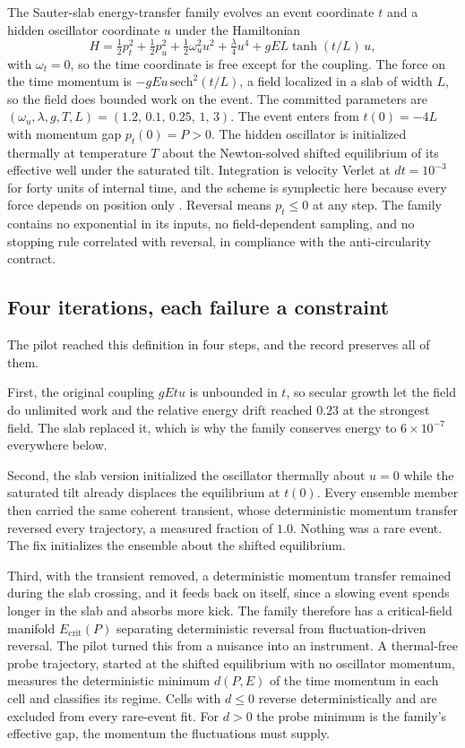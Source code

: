 \documentclass[aps,prd,reprint,nofootinbib,longbibliography]{revtex4-2}
\begin{document}
The Sauter-slab energy-transfer family evolves an event coordinate $t$
and a hidden oscillator coordinate $u$ under the Hamiltonian
\begin{equation}
H = \tfrac{1}{2}p_{t}^{2} + \tfrac{1}{2}p_{u}^{2}
  + \tfrac{1}{2}\omega_{u}^{2}u^{2} + \tfrac{\lambda}{4}u^{4}
  + g E L \tanh(t/L)\, u,
\label{eq:ham}
\end{equation}
with $\omega_{t} = 0$, so the time coordinate is free except for the
coupling.  The force on the time momentum is
$-gEu\,\mathrm{sech}^{2}(t/L)$, a field localized in a slab of width $L$,
so the field does bounded work on the event.  The committed parameters
are $(\omega_{u}, \lambda, g, T, L) = (1.2,\, 0.1,\, 0.25,\, 1,\, 3)$.
The event enters from $t(0) = -4L$ with momentum gap $p_{t}(0) = P > 0$.
The hidden oscillator is initialized thermally at temperature $T$ about
the Newton-solved shifted equilibrium of its effective well under the
saturated tilt.  Integration is velocity Verlet at $dt = 10^{-3}$ for forty units of
internal time, and the scheme is symplectic here because every force
depends on position only \cite{HairerLubichWanner}.  Reversal means
$p_{t} \le 0$ at any step.
The family contains no exponential in its inputs, no field-dependent
sampling, and no stopping rule correlated with reversal, in compliance
with the anti-circularity contract.

\subsection{Four iterations, each failure a constraint}

The pilot reached this definition in four steps, and the record preserves
all of them.

First, the original coupling $gEtu$ is unbounded in $t$, so secular
growth let the field do unlimited work and the relative energy drift
reached $0.23$ at the strongest field.  The slab replaced it, which is
why the family conserves energy to $6\times10^{-7}$ everywhere below.

Second, the slab version initialized the oscillator thermally about
$u = 0$ while the saturated tilt already displaces the equilibrium at
$t(0)$.  Every ensemble member then carried the same coherent transient,
whose deterministic momentum transfer reversed every trajectory, a
measured fraction of $1.0$.  Nothing was a rare event.  The fix
initializes the ensemble about the shifted equilibrium.

Third, with the transient removed, a deterministic momentum transfer
remained during the slab crossing, and it feeds back on itself, since a
slowing event spends longer in the slab and absorbs more kick.  The
family therefore has a critical-field manifold $E_{\mathrm{crit}}(P)$
separating deterministic reversal from fluctuation-driven reversal.  The
pilot turned this from a nuisance into an instrument.  A thermal-free
probe trajectory, started at the shifted equilibrium with no oscillator
momentum, measures the deterministic minimum $d(P, E)$ of the time
momentum in each cell and classifies its regime.  Cells with $d \le 0$
reverse deterministically and are excluded from every rare-event fit.
For $d > 0$ the probe minimum is the family's effective gap, the
momentum the fluctuations must supply.
\end{document}
